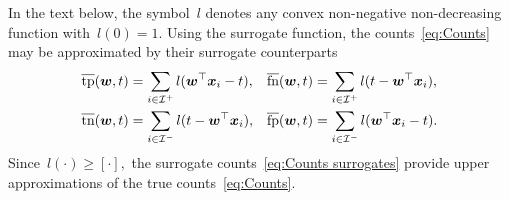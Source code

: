 \documentclass[11pt,a4paper]{article}
\theoremstyle{definition}
\newcommand{\I}{\mathcal{I}}
\newcommand{\tps}{\overline{\textnormal{tp}}}
\newcommand{\tns}{\overline{\textnormal{tn}}}
\newcommand{\fps}{\overline{\textnormal{fp}}}
\newcommand{\fns}{\overline{\textnormal{fn}}}
\begin{document}
In the text below, the symbol~$l$ denotes any convex non-negative non-decreasing function with~$l(0)=1.$ Using the surrogate function, the counts~\eqref{eq:Counts} may be approximated by their surrogate counterparts
\begin{equation}\label{eq:Counts surrogates}
  \begin{aligned}
    \tps(\bm{w} ,t) & = \sum_{i \in \I^+}l(\bm{w}^\top \bm{x}_i - t), &
    \fns(\bm{w} ,t) & = \sum_{i \in \I^+}l(t - \bm{w}^\top \bm{x}_i), \\
    \tns(\bm{w} ,t) & = \sum_{i \in \I^-}l(t - \bm{w}^\top \bm{x}_i),&
    \fps(\bm{w} ,t) & = \sum_{i \in \I^-}l(\bm{w}^\top \bm{x}_i - t).
  \end{aligned}
\end{equation}
Since~$l(\cdot)\ge[\cdot],$ the surrogate counts~\eqref{eq:Counts surrogates} provide upper approximations of the true counts~\eqref{eq:Counts}.
\end{document}
